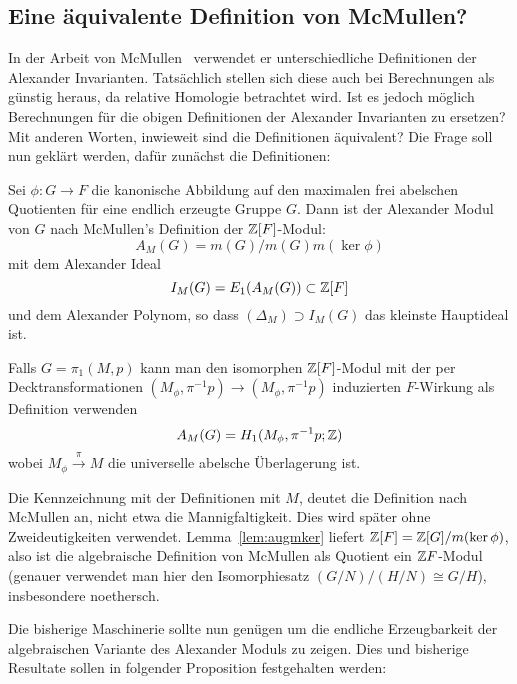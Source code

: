 \subsection{Eine äquivalente Definition von McMullen?}
    
In der Arbeit von McMullen~\cite{MCMULLEN.2002} verwendet er unterschiedliche Definitionen der Alexander Invarianten. Tatsächlich stellen sich diese auch bei Berechnungen als günstig heraus, da relative Homologie betrachtet wird. Ist es jedoch möglich Berechnungen für die obigen Definitionen der Alexander Invarianten zu ersetzen? Mit anderen Worten, inwieweit sind die Definitionen äquivalent? Die Frage soll nun geklärt werden, dafür zunächst die Definitionen:

\begin{defn}
\label{def:Mcmullen}
	Sei $\phi: G \to F$ die kanonische Abbildung auf den maximalen frei abelschen Quotienten für eine endlich erzeugte Gruppe $G$. Dann ist der Alexander Modul von $G$ nach McMullen's Definition der $\mathbb{Z}[F]$-Modul:
	\[
		A_M(G) = m(G)/m(G)m(\ker\phi)
	\]
	mit dem Alexander Ideal
	\[
		I_M(G) = E_1 (A_M(G)) \subset \mathbb{Z}[F]
	\]
	und dem Alexander Polynom, so dass $(\Delta_M ) \supset I_M(G)$ das kleinste Hauptideal ist.

	Falls $G=\pi_1(M,p)$ kann man den isomorphen $\mathbb{Z}[F]$-Modul mit der per Decktransformationen $(M_\phi,\pi^{-1}p) \to (M_\phi,\pi^{-1}p)$ induzierten $F$-Wirkung als Definition verwenden 
	\[
		A_M(G)= H_1(M_\phi,\pi^{-1}p;\mathbb{Z})
	\]
	wobei $M_\phi \stackrel \pi \to M$ die universelle abelsche Überlagerung ist.
\end{defn}
Die Kennzeichnung mit der Definitionen mit $M$, deutet die Definition nach McMullen an, nicht etwa die Mannigfaltigkeit. Dies wird später ohne Zweideutigkeiten verwendet. Lemma~\ref{lem:augmker} liefert $\mathbb{Z}[F]=\mathbb{Z}[G]/m(\ker\phi)$, also ist die algebraische Definition von McMullen als Quotient ein $\mathbb{Z} F$-Modul (genauer verwendet man hier den Isomorphiesatz $(G/N)/(H/N)\cong G/H$), insbesondere noethersch.

Die bisherige Maschinerie sollte nun genügen um die endliche Erzeugbarkeit der algebraischen Variante des Alexander Moduls zu zeigen. Dies und bisherige Resultate sollen in folgender Proposition festgehalten werden:


